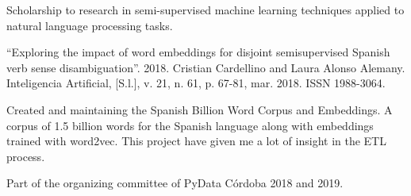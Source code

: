\documentclass[]{deedy-resume-openfont}
\begin{document}
Scholarship to research in semi-supervised machine learning techniques applied
to natural language processing tasks.
\begin{tightemize}
\item ``Exploring the impact of word embeddings for disjoint semisupervised Spanish verb 
sense disambiguation''. 2018. Cristian Cardellino and Laura Alonso Alemany.
Inteligencia Artificial, [S.l.], v. 21, n. 61, p. 67-81, mar. 2018. ISSN 1988-3064.
\end{tightemize}
\sectionsep

Created and maintaining the Spanish Billion Word Corpus and Embeddings. A corpus 
of 1.5 billion words for the Spanish language along with embeddings trained with
word2vec. This project have given me a lot of insight in the ETL process.
\sectionsep

Part of the organizing committee of PyData C\'ordoba 2018 and 2019.
\sectionsep



\end{document}
